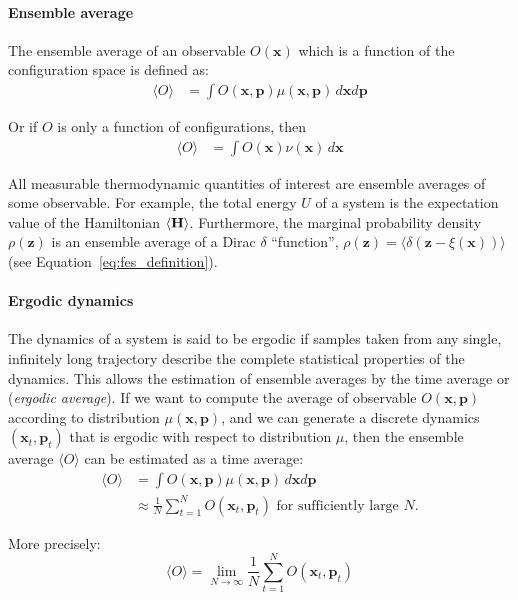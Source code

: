 \documentclass[9pt,review]{livecoms}
\newcommand{\vx}{\mathbf{x}}
\newcommand{\vp}{\mathbf{p}}
\newcommand{\vz}{\mathbf{z}}
\begin{document}
\hypertarget{ref:ensemble_average} {\paragraph{Ensemble average}}

The ensemble average of an observable $O(\vx)$ which is a function of the configuration space is defined as:
\begin{align}
\langle O \rangle &= \int O(\vx, \vp) \mu(\vx, \vp) \, d\vx d\vp
\end{align}

Or if $O$ is only a function of configurations, then
\begin{align}
\langle O \rangle &= \int O(\vx) \nu(\vx) \, d\vx
\end{align}

All measurable thermodynamic quantities of interest are ensemble averages of some observable. For example, the total energy $U$ of a system is the expectation value of the Hamiltonian $\langle \bf{H} \rangle$. Furthermore, the marginal probability density $\rho(\vz)$ is an ensemble average of a Dirac $\delta$ ``function'', $\rho(\vz)=\langle \delta\left(\vz-\xi(\vx)\right) \rangle$ (see Equation~\ref{eq:fes_definition}).

\hypertarget{ref:ergodic} {\paragraph{Ergodic dynamics}}
The dynamics of a system is said to be ergodic if samples taken from any single, infinitely long trajectory describe the complete statistical properties of the dynamics.
This allows the estimation of ensemble averages by the time average or (\textit{ergodic average}).
If we want to compute the average of observable $O(\vx, \vp)$ according to distribution $\mu(\vx, \vp)$, and we can generate a discrete dynamics $(\vx_t, \vp_t)$ that is ergodic with respect to distribution $\mu$, then the ensemble average $\langle O \rangle$ can be estimated as a time average:
\begin{align}
\langle O \rangle &= \int O(\vx, \vp) \mu(\vx, \vp) \, d\vx d\vp
\nonumber \\
&\approx \frac{1}{N} \sum_{t=1}^N O(\vx_t, \vp_t) \text{ for sufficiently large $N$.}
\end{align}

More precisely:
\begin{equation}
   \langle O \rangle = \lim_{N \to \infty} \frac{1}{N} \sum_{t=1}^N O(\vx_t, \vp_t)
    \label{eq:ergodic}
\end{equation}
\end{document}
